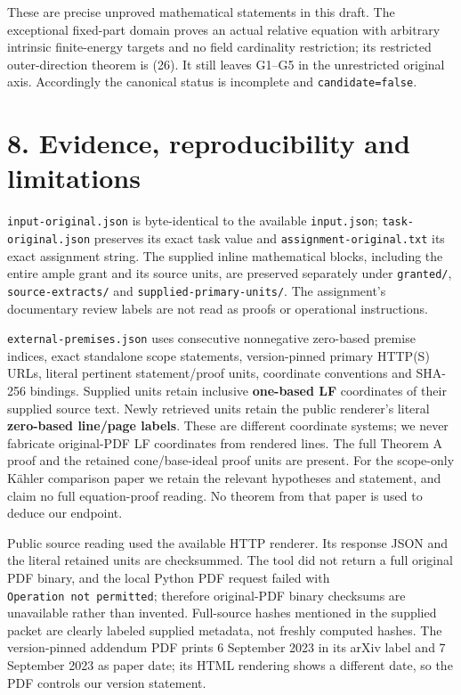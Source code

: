 \documentclass[
  10pt,
]{article}
\begin{document}
These are precise unproved mathematical statements in this draft. The
exceptional fixed-part domain proves an actual relative equation with
arbitrary intrinsic finite-energy targets and no field cardinality
restriction; its restricted outer-direction theorem is (26). It still
leaves G1--G5 in the unrestricted original axis. Accordingly the
canonical status is incomplete and \texttt{candidate=false}.

\section{8. Evidence, reproducibility and
limitations}\label{evidence-reproducibility-and-limitations}

\texttt{input-original.json} is byte-identical to the available
\texttt{input.json}; \texttt{task-original.json} preserves its exact
task value and \texttt{assignment-original.txt} its exact assignment
string. The supplied inline mathematical blocks, including the entire
ample grant and its source units, are preserved separately under
\texttt{granted/}, \texttt{source-extracts/} and
\texttt{supplied-primary-units/}. The assignment's documentary review
labels are not read as proofs or operational instructions.

\texttt{external-premises.json} uses consecutive nonnegative zero-based
premise indices, exact standalone scope statements, version-pinned
primary HTTP(S) URLs, literal pertinent statement/proof units,
coordinate conventions and SHA-256 bindings. Supplied units retain
inclusive \textbf{one-based LF} coordinates of their supplied source
text. Newly retrieved units retain the public renderer's literal
\textbf{zero-based line/page labels}. These are different coordinate
systems; we never fabricate original-PDF LF coordinates from rendered
lines. The full Theorem A proof and the retained cone/base-ideal proof
units are present. For the scope-only Kähler comparison paper we retain
the relevant hypotheses and statement, and claim no full equation-proof
reading. No theorem from that paper is used to deduce our endpoint.

Public source reading used the available HTTP renderer. Its response
JSON and the literal retained units are checksummed. The tool did not
return a full original PDF binary, and the local Python PDF request
failed with \texttt{Operation\ not\ permitted}; therefore original-PDF
binary checksums are unavailable rather than invented. Full-source
hashes mentioned in the supplied packet are clearly labeled supplied
metadata, not freshly computed hashes. The version-pinned addendum PDF
prints 6 September 2023 in its arXiv label and 7 September 2023 as paper
date; its HTML rendering shows a different date, so the PDF controls our
version statement.
\end{document}
